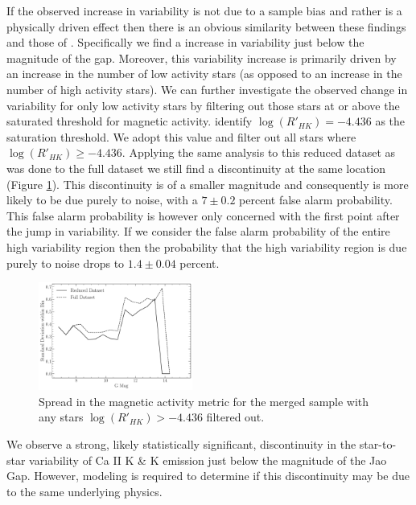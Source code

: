 If the observed increase in variability is not due to a sample bias and rather
is a physically driven effect then there is an obvious similarity between these
findings and those of \citep{Jao2023}. Specifically we find a increase in
variability just below the magnitude of the gap. Moreover, this variability
increase is primarily driven by an increase in the number of low activity stars
(as opposed to an increase in the number of high activity stars). We can
further investigate the observed change in variability for only low activity
stars by filtering out those stars at or above the saturated threshold for
magnetic activity. \citet{Boudreaux2022} identify $\log(R'_{HK}) = -4.436$ as
the saturation threshold. We adopt this value and filter out all stars where
$\log(R'_{HK}) \geq -4.436$. Applying the same analysis to this reduced dataset
as was done to the full dataset we still find a discontinuity at the same
location (Figure \ref{fig:reduced}). This discontinuity is of a smaller
magnitude and consequently is more likely to be due purely to noise, with a
$7\pm0.2$ percent false alarm probability. This false alarm probability is
however only concerned with the first point after the jump in variability. If
we consider the false alarm probability of the entire high variability region
then the probability that the high variability region is due purely to noise
drops to $1.4\pm0.04$ percent.

\begin{figure}
  \centering
  \includegraphics[width=0.45\textwidth]{figures/jaoMagActivity/ReducedDeviation.pdf}
  \caption{Spread in the magnetic activity metric for the merged sample with
  any stars $\log(R'_{HK}) > -4.436$ filtered out.}
  \label{fig:reduced}
\end{figure}

We observe a strong, likely statistically significant, discontinuity in the
star-to-star variability of Ca II K \& K emission just below the magnitude
of the Jao Gap. However, modeling is required to determine if this discontinuity
may be due to the same underlying physics.

